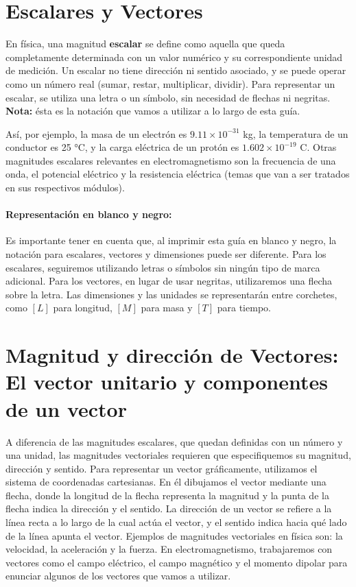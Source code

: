 \documentclass{book}
\begin{document}

\section{Escalares y Vectores}

En física, una magnitud \textbf{escalar} se define como aquella que queda completamente determinada con un valor numérico y su correspondiente unidad de medición. Un escalar no tiene dirección ni sentido asociado, y se puede operar como un número real (sumar, restar, multiplicar, dividir). Para representar un escalar, se utiliza una letra o un símbolo, sin necesidad de flechas ni negritas. \textbf{Nota:} ésta es la notación que vamos a utilizar a lo largo de esta guía.

Así, por ejemplo, la masa de un electrón es $9.11 \times 10^{-31}$ kg, la temperatura de un conductor es 25 °C, y la carga eléctrica de un protón es $1.602 \times 10^{-19}$ C. Otras magnitudes escalares relevantes en electromagnetismo son la frecuencia de una onda, el potencial eléctrico y la resistencia eléctrica (temas que van a ser tratados en sus respectivos módulos).

\paragraph{Representación en blanco y negro:} Es importante tener en cuenta que, al imprimir esta guía en blanco y negro, la notación para escalares, vectores y dimensiones puede ser diferente. Para los escalares, seguiremos utilizando letras o símbolos sin ningún tipo de marca adicional. Para los vectores, en lugar de usar negritas, utilizaremos una flecha sobre la letra. Las dimensiones y las unidades se representarán entre corchetes, como $[L]$ para longitud, $[M]$ para masa y $[T]$ para tiempo.

\section{Magnitud y dirección de Vectores: El vector unitario y componentes de un vector}

A diferencia de las magnitudes escalares, que quedan definidas con un número y una unidad, las magnitudes vectoriales requieren que especifiquemos su magnitud, dirección y sentido. Para representar un vector gráficamente, utilizamos el sistema de coordenadas cartesianas. En él dibujamos el vector mediante una flecha, donde la longitud de la flecha representa la magnitud y la punta de la flecha indica la dirección y el sentido. La dirección de un vector se refiere a la línea recta a lo largo de la cual actúa el vector, y el sentido indica hacia qué lado de la línea apunta el vector. Ejemplos de magnitudes vectoriales en física son: la velocidad, la aceleración y la fuerza. En electromagnetismo, trabajaremos con vectores como el campo eléctrico, el campo magnético y el momento dipolar para enunciar algunos de los vectores que vamos a utilizar.
\end{document}
